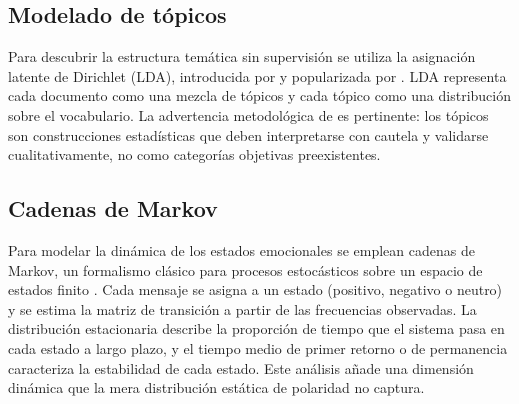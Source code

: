\subsection{Modelado de tópicos}

Para descubrir la estructura temática sin supervisión se utiliza la asignación latente
de Dirichlet (LDA), introducida por \citet{blei2003lda} y popularizada por
\citet{blei2012topicmodels}. LDA representa cada documento como una mezcla de tópicos y
cada tópico como una distribución sobre el vocabulario. La advertencia metodológica de
\citet{grimmer2013text} es pertinente: los tópicos son construcciones estadísticas que
deben interpretarse con cautela y validarse cualitativamente, no como categorías
objetivas preexistentes.

\subsection{Cadenas de Markov}

Para modelar la dinámica de los estados emocionales se emplean cadenas de Markov, un
formalismo clásico para procesos estocásticos sobre un espacio de estados finito
\citep{norris1997markov}. Cada mensaje se asigna a un estado (positivo, negativo o
neutro) y se estima la matriz de transición a partir de las frecuencias observadas. La
distribución estacionaria describe la proporción de tiempo que el sistema pasa en cada
estado a largo plazo, y el tiempo medio de primer retorno o de permanencia caracteriza
la estabilidad de cada estado. Este análisis añade una dimensión dinámica que la mera
distribución estática de polaridad no captura.
